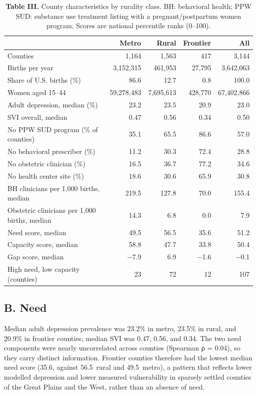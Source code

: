 \documentclass{article}
\begin{document}
\begin{table}
\centering
\caption{\textbf{Table III.} County characteristics by rurality class. BH: behavioral health; PPW SUD: substance use treatment listing with a pregnant/postpartum women program. Scores are national percentile ranks (0--100).}

\begin{tabular}{@{}lrrrr@{}}
\toprule
 & Metro & Rural & Frontier & All \\
\midrule
Counties & 1,164 & 1,563 & 417 & 3,144 \\
Births per year & 3,152,315 & 461,953 & 27,795 & 3,642,063 \\
Share of U.S. births (\%) & 86.6 & 12.7 & 0.8 & 100.0 \\
Women aged 15--44 & 59,278,483 & 7,695,613 & 428,770 & 67,402,866 \\
Adult depression, median (\%) & 23.2 & 23.5 & 20.9 & 23.0 \\
SVI overall, median & 0.47 & 0.56 & 0.34 & 0.50 \\
No PPW SUD program (\% of counties) & 35.1 & 65.5 & 86.6 & 57.0 \\
No behavioral prescriber (\%) & 11.2 & 30.3 & 72.4 & 28.8 \\
No obstetric clinician (\%) & 16.5 & 36.7 & 77.2 & 34.6 \\
No health center site (\%) & 18.6 & 30.6 & 65.9 & 30.8 \\
BH clinicians per 1,000 births, median & 219.5 & 127.8 & 70.0 & 155.4 \\
Obstetric clinicians per 1,000 births, median & 14.3 & 6.8 & 0.0 & 7.9 \\
Need score, median & 49.5 & 56.5 & 35.6 & 51.2 \\
Capacity score, median & 58.8 & 47.7 & 33.8 & 50.4 \\
Gap score, median & −7.9 & 6.9 & −1.6 & −0.1 \\
High need, low capacity (counties) & 23 & 72 & 12 & 107 \\
\bottomrule
\end{tabular}
\end{table}

\subsection*{B. Need}
Median adult depression prevalence was 23.2\% in metro, 23.5\% in rural, and 20.9\% in frontier counties; median SVI was 0.47, 0.56, and 0.34. The two need components were nearly uncorrelated across counties (Spearman ρ = 0.04), so they carry distinct information. Frontier counties therefore had the lowest median need score (35.6, against 56.5\ rural and 49.5\ metro), a pattern that reflects lower modelled depression and lower measured vulnerability in sparsely settled counties of the Great Plains and the West, rather than an absence of need.
\end{document}
